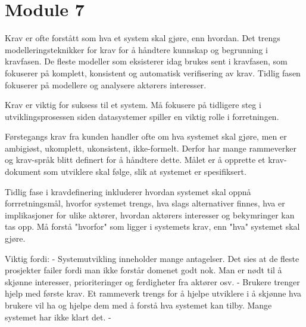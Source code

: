 \section{Module 7}
Krav er ofte forstått som hva et system skal gjøre, enn hvordan. Det trengs modelleringsteknikker for krav for å håndtere kunnskap og begrunning i kravfasen. De fleste modeller som eksisterer idag brukes sent i kravfasen, som fokuserer på komplett, konsistent og automatisk verifisering av krav. Tidlig fasen fokuserer på modellere og analysere aktørers interesser.

Krav er viktig for suksess til et system. Må fokusere på tidligere steg i utviklingsprosessen siden datasystemer spiller en viktig rolle i forretningen.

Førstegangs krav fra kunden handler ofte om hva systemet skal gjøre, men er ambigiøst, ukomplett, ukonsistent, ikke-formelt. Derfor har mange rammeverker og krav-språk blitt definert for å håndtere dette. Målet er å opprette et krav-dokument som utviklere skal følge, slik at systemet er spesifiksert. 

Tidlig fase i kravdefinering inkluderer hvordan systemet skal oppnå forrretningsmål, hvorfor systemet trengs, hva slags alternativer finnes, hva er implikasjoner for ulike aktører, hvordan aktørers interesser og bekymringer kan tas opp. Må forstå "hvorfor" som ligger i systemets krav, enn "hva" systemet skal gjøre.

Viktig fordi:
- Systemutvikling inneholder mange antagelser. Det sies at de fleste prosjekter failer fordi man ikke forstår domenet godt nok. Man er nødt til å skjønne interesser, prioriteringer og ferdigheter fra aktører osv.
- Brukere trenger hjelp med første krav. Et rammeverk trengs for å hjelpe utviklere i å skjønne hva brukere vil ha og hjelpe dem med å forstå hva systemet kan tilby. Mange systemet har ikke klart det.
- 
